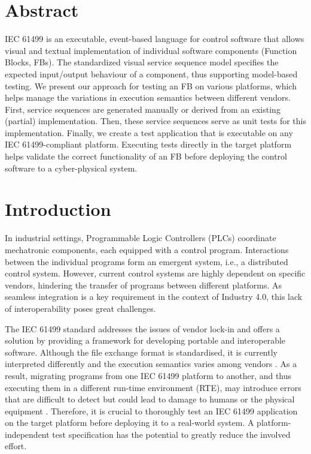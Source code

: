 \begin{bibunit}
\thispagestyle{plain}


\section*{Abstract}
    IEC 61499 is an executable, event-based language for control software that allows visual and textual implementation of individual software components (Function Blocks, FBs). The standardized visual service sequence model specifies the expected input/output behaviour of a component, thus supporting model-based testing. We present our approach for testing an FB on various platforms, which helps manage the variations in execution semantics between different vendors. First, service sequences are generated manually or derived from an existing (partial) implementation. Then, these service sequences serve as unit tests for this implementation. Finally, we create a test application that is executable on any IEC 61499-compliant platform. Executing tests directly in the target platform helps validate the correct functionality of an FB before deploying the control software to a cyber-physical system. 

\section{Introduction}

In industrial settings, Programmable Logic Controllers (PLCs) coordinate mechatronic components, each equipped with a control program. Interactions between the individual programs form an emergent system, i.e., a distributed control system. However, current control systems are highly dependent on specific vendors, hindering the transfer of programs between different platforms. As seamless integration is a key requirement in the context of Industry 4.0, this lack of interoperability poses great challenges.

The IEC 61499 standard \cite{61499} addresses the issues of vendor lock-in and offers a solution by providing a framework for developing portable and interoperable software. Although the file exchange format is standardised, it is currently interpreted differently and the execution semantics varies among vendors \cite{christensen.2012,Thramboulidis.2009}. As a result, migrating programs from one IEC 61499 platform to another, and thus executing them in a different run-time environment (RTE), may introduce errors that are difficult to detect but could lead to damage to humans or the physical equipment \cite{Testing_Midhun}. Therefore, it is crucial to thoroughly test an IEC 61499 application on the target platform before deploying it to a real-world system. A platform-independent test specification has the potential to greatly reduce the involved effort.


\end{bibunit}
